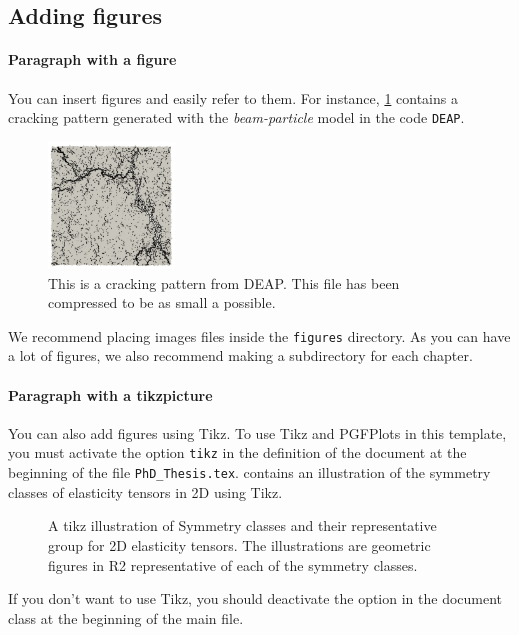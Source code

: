 \subsection{Adding figures}%
\label{sub:adding_figures}

\paragraph{Paragraph with a figure}%
\label{par:paragraph_with_a_figure}
You can insert figures and easily refer to them.
For instance, \cref{fig:c1_cracking_pattern} contains a cracking pattern generated with the \emph{beam-particle} model in the code \texttt{DEAP}.
\begin{figure}
    \centering
    \includegraphics[width=0.3\textwidth]{figures/chapter_1/cracking_pattern_pbc_willam_4.jpg}
    \caption{This is a cracking pattern from DEAP. This file has been compressed to be as small a possible.}
    \label{fig:c1_cracking_pattern}
\end{figure}
We recommend placing images files inside the \texttt{figures} directory.
As you can have a lot of figures, we also recommend making a subdirectory for each chapter.

\paragraph{Paragraph with a tikzpicture}%
\label{par:paragraph_with_a_tikzpicture}
You can also add figures using Tikz.
To use Tikz and PGFPlots in this template, you must activate the option \texttt{tikz} in the definition of the document at the beginning of the file \texttt{PhD\_Thesis.tex}.
 contains an illustration of the symmetry classes of elasticity tensors in 2D using Tikz.
\begin{figure}
    \centering
    
    \caption{A tikz illustration of Symmetry classes and their representative group for 2D elasticity tensors. The illustrations are geometric figures in R2 representative of each of the symmetry classes.}
    \label{fig:c1_illustrations_symmetry_classes}
\end{figure}
\begin{remark}
    If you don't want to use Tikz, you should deactivate the option in the document class at the beginning of the main file.
\end{remark}

